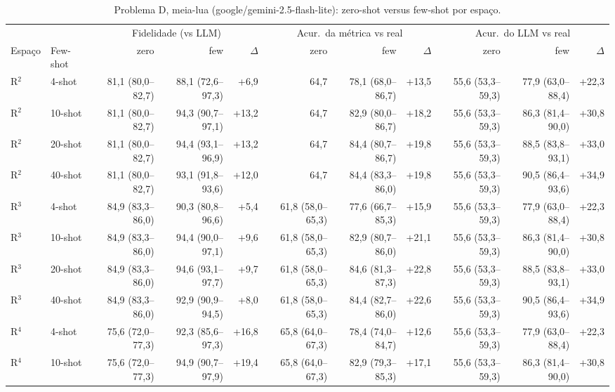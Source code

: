 \begin{table}[htbp]
\centering
\footnotesize
\caption{Problema D, meia-lua (google/gemini-2.5-flash-lite): zero-shot versus few-shot por espaço.}
\label{tab:bloco1_D_zero_vs_fewshot_comparacao_flashlite}
\begin{tabular}{llrrrrrrrrr}
\toprule
 &  & \multicolumn{3}{c}{Fidelidade (vs LLM)} & \multicolumn{3}{c}{Acur.\ da métrica vs real} & \multicolumn{3}{c}{Acur.\ do LLM vs real} \\ \cmidrule(lr){3-5} \cmidrule(lr){6-8} \cmidrule(lr){9-11}
Espaço & Few-shot & zero & few & $\Delta$ & zero & few & $\Delta$ & zero & few & $\Delta$ \\
\midrule
R$^2$ & 4-shot & 81,1 (80,0–82,7) & 88,1 (72,6–97,3) & +6,9 & 64,7 & 78,1 (68,0–86,7) & +13,5 & 55,6 (53,3–59,3) & 77,9 (63,0–88,4) & +22,3 \\
R$^2$ & 10-shot & 81,1 (80,0–82,7) & 94,3 (90,7–97,1) & +13,2 & 64,7 & 82,9 (80,0–86,7) & +18,2 & 55,6 (53,3–59,3) & 86,3 (81,4–90,0) & +30,8 \\
R$^2$ & 20-shot & 81,1 (80,0–82,7) & 94,4 (93,1–96,9) & +13,2 & 64,7 & 84,4 (80,7–86,7) & +19,8 & 55,6 (53,3–59,3) & 88,5 (83,8–93,1) & +33,0 \\
R$^2$ & 40-shot & 81,1 (80,0–82,7) & 93,1 (91,8–93,6) & +12,0 & 64,7 & 84,4 (83,3–86,0) & +19,8 & 55,6 (53,3–59,3) & 90,5 (86,4–93,6) & +34,9 \\
\midrule
R$^3$ & 4-shot & 84,9 (83,3–86,0) & 90,3 (80,8–96,6) & +5,4 & 61,8 (58,0–65,3) & 77,6 (66,7–85,3) & +15,9 & 55,6 (53,3–59,3) & 77,9 (63,0–88,4) & +22,3 \\
R$^3$ & 10-shot & 84,9 (83,3–86,0) & 94,4 (90,0–97,1) & +9,6 & 61,8 (58,0–65,3) & 82,9 (80,7–86,0) & +21,1 & 55,6 (53,3–59,3) & 86,3 (81,4–90,0) & +30,8 \\
R$^3$ & 20-shot & 84,9 (83,3–86,0) & 94,6 (93,1–97,7) & +9,7 & 61,8 (58,0–65,3) & 84,6 (81,3–87,3) & +22,8 & 55,6 (53,3–59,3) & 88,5 (83,8–93,1) & +33,0 \\
R$^3$ & 40-shot & 84,9 (83,3–86,0) & 92,9 (90,9–94,5) & +8,0 & 61,8 (58,0–65,3) & 84,4 (82,7–86,0) & +22,6 & 55,6 (53,3–59,3) & 90,5 (86,4–93,6) & +34,9 \\
\midrule
R$^4$ & 4-shot & 75,6 (72,0–77,3) & 92,3 (85,6–97,3) & +16,8 & 65,8 (64,0–67,3) & 78,4 (74,0–84,7) & +12,6 & 55,6 (53,3–59,3) & 77,9 (63,0–88,4) & +22,3 \\
R$^4$ & 10-shot & 75,6 (72,0–77,3) & 94,9 (90,7–97,9) & +19,4 & 65,8 (64,0–67,3) & 82,9 (79,3–85,3) & +17,1 & 55,6 (53,3–59,3) & 86,3 (81,4–90,0) & +30,8 \\

\end{tabular}
\end{table}
